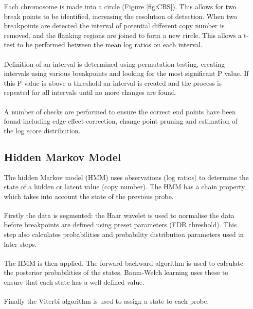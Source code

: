 Each chromosome is made into a circle (Figure \ref{fig:CBS}). This allows for two break points to be identified, increasing the resolution of detection. When two breakpoints are detected the interval of potential different copy number is removed, and the flanking regions are joined to form a new circle. This allows a t-test to be performed between the mean log ratios on each interval. 
\paragraph*{}
Definition of an interval is determined using permutation testing, creating intervals using various breakpoints and looking for the most significant P value. If this P value is above a threshold an interval is created and the process is repeated for all intervals until no more changes are found.
\paragraph*{}
A number of checks are performed to ensure the correct end points have been found including edge effect correction, change point pruning and estimation of the log score distribution.

\subsection{Hidden Markov Model}
The hidden Markov model (HMM) \cite{agilent_technologies_agilent_2011} uses observations (log ratios) to determine the state of a hidden or latent value (copy number). The HMM has a chain property which takes into account the state of the previous probe.
\paragraph*{}
Firstly the data is segmented: the Haar wavelet is used to normalise the data before breakpoints are defined using preset parameters (FDR threshold). This step also calculates probabilities and probability distribution parameters used in later steps.
\paragraph*{}
The HMM is then applied. The forward-backward algorithm is used to calculate the posterior probabilities of the states. Baum-Welch learning uses these to ensure that each state has a well defined value.
\paragraph*{}
Finally the Viterbi algorithm is used to assign a state to each probe.

